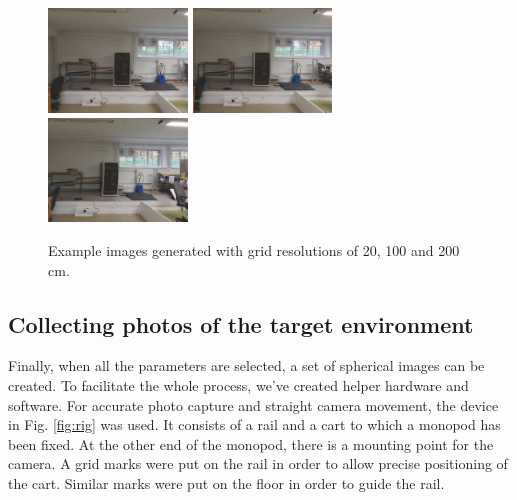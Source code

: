 \documentclass{svproc}
\begin{document}
\begin{figure}[!ht]
    \centering
    \includegraphics[width=0.33\textwidth]{img/grid_sizes/10}\hfill%
    \includegraphics[width=0.33\textwidth]{img/grid_sizes/50}\hfill%
    \includegraphics[width=0.33\textwidth]{img/grid_sizes/100}\\
    \caption{Example images generated with grid resolutions of 20, 100 and 200 cm.}
    \label{fig:grid_sizes}
\end{figure}

\subsection{Collecting photos of the target environment}

Finally, when all the parameters are selected, a set of spherical images can be created.
To facilitate the whole process, we've created helper hardware and software.
For accurate photo capture and straight camera movement, the device in Fig. \ref{fig:rig} was used.
It consists of a rail and a cart to which a monopod has been fixed.
At the other end of the monopod, there is a mounting point for the camera.
A grid marks were put on the rail in order to allow precise positioning of the cart.
Similar marks were put on the floor in order to guide the rail.
\end{document}
